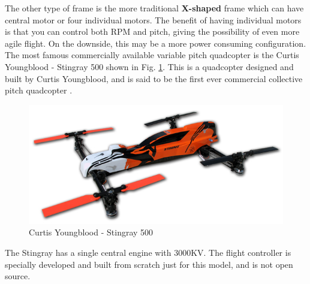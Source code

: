 The other type of frame is the more traditional \textbf{X-shaped} frame which can have central motor or four individual motors. The benefit of having individual motors is that you can control both RPM and pitch, giving the possibility of even more agile flight. On the downside, this may be a more power consuming configuration. \\

The most famous commercially available variable pitch quadcopter is the Curtis Youngblood - Stingray 500 shown in Fig. \ref{fig:stingray}. This is a quadcopter designed and built by Curtis Youngblood, and is said to be the first ever commercial collective pitch quadcopter \cite{curtis}.  

\begin{figure}[h]
\centering
    \includegraphics[scale = 1]{VAPIQ-PICTURES/stingray}
    \caption{Curtis Youngblood - Stingray 500}
    \label{fig:stingray}    
\end{figure}

The Stingray has a single central engine with 3000KV. The flight controller is specially developed and built from scratch just for this model, and is not open source.

 

